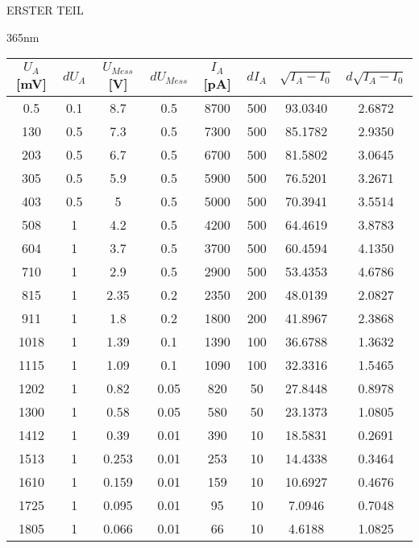 \begin{appendix}
\begin{chapter}{ERSTER TEIL}
\begin{section}{365nm}
        \begin{table}[htbp]
          \centering
          \scriptsize
          \begin{tabular}{|c|c|c|c|c|c|c|c|}
            \hline
            $U_{A}$ [mV] & $dU_{A}$ & $U_{Mess}$ [V] & $dU_{Mess}$ & 
                $I_{A}$ [pA] & $dI_{A}$ & $\sqrt{I_{A}-I_0}$ & 
                $d\sqrt{I_{A}-I_0}$ \\ \hline
            0.5 & 0.1 & 8.7 & 0.5 & 8700 & 500 & 93.0340 & 2.6872 \\ \hline
            130 & 0.5 & 7.3 & 0.5 & 7300 & 500 & 85.1782 & 2.9350 \\ \hline
            203 & 0.5 & 6.7 & 0.5 & 6700 & 500 & 81.5802 & 3.0645 \\ \hline
            305 & 0.5 & 5.9 & 0.5 & 5900 & 500 & 76.5201 & 3.2671 \\ \hline
            403 & 0.5 & 5 & 0.5 & 5000 & 500 & 70.3941 & 3.5514 \\ \hline
            508 & 1 & 4.2 & 0.5 & 4200 & 500 & 64.4619 & 3.8783 \\ \hline
            604 & 1 & 3.7 & 0.5 & 3700 & 500 & 60.4594 & 4.1350 \\ \hline
            710 & 1 & 2.9 & 0.5 & 2900 & 500 & 53.4353 & 4.6786 \\ \hline
            815 & 1 & 2.35 & 0.2 & 2350 & 200 & 48.0139 & 2.0827 \\ \hline
            911 & 1 & 1.8 & 0.2 & 1800 & 200 & 41.8967 & 2.3868 \\ \hline
            1018 & 1 & 1.39 & 0.1 & 1390 & 100 & 36.6788 & 1.3632 \\ \hline
            1115 & 1 & 1.09 & 0.1 & 1090 & 100 & 32.3316 & 1.5465 \\ \hline
            1202 & 1 & 0.82 & 0.05 & 820 & 50 & 27.8448 & 0.8978 \\ \hline
            1300 & 1 & 0.58 & 0.05 & 580 & 50 & 23.1373 & 1.0805 \\ \hline
            1412 & 1 & 0.39 & 0.01 & 390 & 10 & 18.5831 & 0.2691 \\ \hline
            1513 & 1 & 0.253 & 0.01 & 253 & 10 & 14.4338 & 0.3464 \\ \hline
            1610 & 1 & 0.159 & 0.01 & 159 & 10 & 10.6927 & 0.4676 \\ \hline
            1725 & 1 & 0.095 & 0.01 & 95 & 10 & 7.0946 & 0.7048 \\ \hline
            1805 & 1 & 0.066 & 0.01 & 66 & 10 & 4.6188 & 1.0825 \\ \hline

\end{tabular}
\end{table}
\end{section}
\end{chapter}
\end{appendix}
